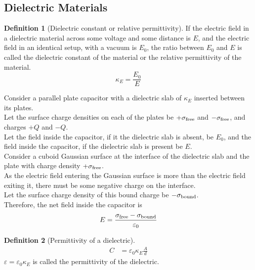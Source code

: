 \documentclass[fleqn, a4paper, 8pt, twoside]{amsart}
\theoremstyle{definition}
\newtheorem{definition}{Definition}
\theoremstyle{theorem}
\begin{document}
\begin{multicols}{2}
\begin{spacing}{0.6}
\section{Dielectric Materials}

\begin{definition}[Dielectric constant or relative permittivity]
	If the electric field in a dielectric material across some voltage and some distance is $E$, and the electric field in an identical setup, with a vacuum is $E_0$, the ratio between $E_0$ and $E$ is called the dielectric constant of the material or the relative permittivity of the material.
	\begin{equation*}
		\kappa_E = \frac{E_0}{E}
	\end{equation*}
\end{definition}

Consider a parallel plate capacitor with a dielectric slab of $\kappa_E$ inserted between its plates.\\
Let the surface charge densities on each of the plates be $+\sigma_{\textnormal{free}}$ and $-\sigma_{\textnormal{free}}$, and charges $+Q$ and $-Q$.\\
Let the field inside the capacitor, if it the dielectric slab is absent, be $E_0$, and the field inside the capacitor, if the dielectric slab is present be $E$.\\
Consider a cuboid Gaussian surface at the interface of the dielectric slab and the plate with charge density $+\sigma_{\textnormal{free}}$.\\
As the electric field entering the Gaussian surface is more than the electric field exiting it, there must be some negative charge on the interface.\\
Let the surface charge density of this bound charge be $-\sigma_{\textnormal{bound}}$.\\
Therefore, the net field inside the capacitor is
\begin{equation*}
	E = \frac{\sigma_{\textnormal{free}} - \sigma_{\textnormal{bound}}}{\varepsilon_0}
\end{equation*}

\begin{definition}[Permittivity of a dielectric]
	\begin{align*}
		C & = \varepsilon_0 \kappa_E \frac{A}{d}
	\end{align*}
	$\varepsilon = \varepsilon_0 \kappa_E$ is called the permittivity of the dielectric.
\end{definition}


\end{spacing}
\end{multicols}
\end{document}
